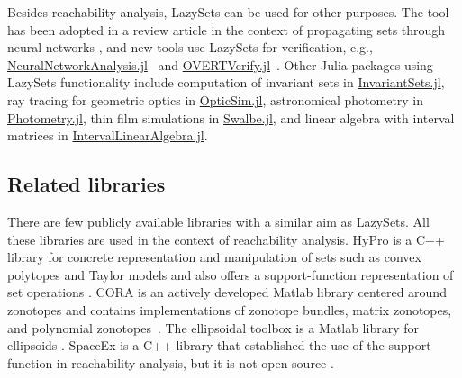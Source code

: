 Besides reachability analysis, LazySets can be used for other purposes. The tool has been adopted in a review article in the context of propagating sets through neural networks \cite{LiuALSBK21}, and new tools use LazySets for verification, e.g.,
\href{https://github.com/JuliaReach/NeuralNetworkAnalysis.jl}{NeuralNetworkAnalysis.jl}~\cite{schilling2021verification} and \href{https://github.com/sisl/OVERTVerify.jl}{OVERTVerify.jl}~\cite{sidrane2021overt}.
%
Other Julia packages using LazySets functionality include computation of invariant sets in \href{https://github.com/ueliwechsler/InvariantSets.jl}{InvariantSets.jl}, ray tracing for geometric optics in \href{https://github.com/microsoft/OpticSim.jl}{OpticSim.jl}, astronomical photometry in \href{https://github.com/JuliaAstro/Photometry.jl}{Photometry.jl}, thin film simulations in \href{https://github.com/Zitzeronion/Swalbe.jl}{Swalbe.jl}, and linear algebra with interval matrices in \href{https://github.com/JuliaIntervals/IntervalLinearAlgebra.jl}{IntervalLinearAlgebra.jl}.

\subsection{Related libraries}

There are few publicly available libraries with a similar aim as LazySets.
%
All these libraries are used in the context of reachability analysis.
%
HyPro is a C++ library for concrete representation and manipulation of sets such as convex polytopes and Taylor models and also offers a support-function representation of set operations \cite{SchuppAMK17}.
%
CORA is an actively developed Matlab library centered around zonotopes and contains implementations of zonotope bundles, matrix zonotopes, and polynomial zonotopes~\cite{Althoff15}.
%
The ellipsoidal toolbox is a Matlab library for ellipsoids \cite{kurzhanskiy2006ellipsoidal}.
%
SpaceEx is a C++ library that established the use of the support function in reachability analysis, but it is not open source \cite{frehse2011spaceex}.

\smallskip

